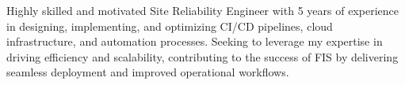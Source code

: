 

Highly skilled and motivated Site Reliability Engineer with 5 years of experience in designing, implementing, and optimizing CI/CD pipelines, cloud infrastructure, and automation processes. Seeking to leverage my expertise in driving efficiency and scalability, contributing to the success of FIS by delivering seamless deployment and improved operational workflows.